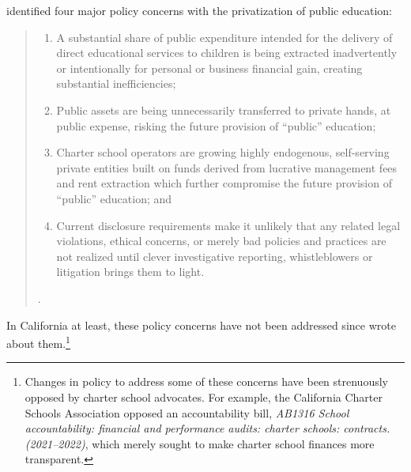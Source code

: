 \citeauthor{Baker.Miron2015} identified four major policy concerns with the privatization of public education:
\vspace{-0.5\baselineskip}
\begin{quotation}\noindent\OnehalfSpacing
  \begin{enumerate}
    \item A substantial share of public expenditure intended for the delivery of direct educational services to children is being extracted inadvertently or intentionally for personal or business financial gain, creating substantial inefficiencies;
    \item Public assets are being unnecessarily transferred to private hands, at public expense, risking the future provision of “public” education;
    \item Charter school operators are growing highly endogenous, self-serving private entities built on funds derived from lucrative management fees and rent extraction which further compromise the future provision of “public” education; and 
    \item Current disclosure requirements make it unlikely that any related legal violations, ethical concerns, or merely bad policies and practices are not realized until clever investigative reporting, whistleblowers or litigation brings them to light.
  \end{enumerate}\parencite[3]{Baker.Miron2015}.
\end{quotation}
In California at least, these policy concerns have not been addressed since \citeauthor{Baker.Miron2015} wrote about them.\footnote{Changes in policy to address some of these concerns have been strenuously opposed by charter school advocates. For example, the California Charter Schools Association opposed an accountability bill, \textit{AB1316 School accountability: financial and performance audits: charter schools: contracts. (2021–2022)}, which merely sought to make charter school finances more transparent.}

